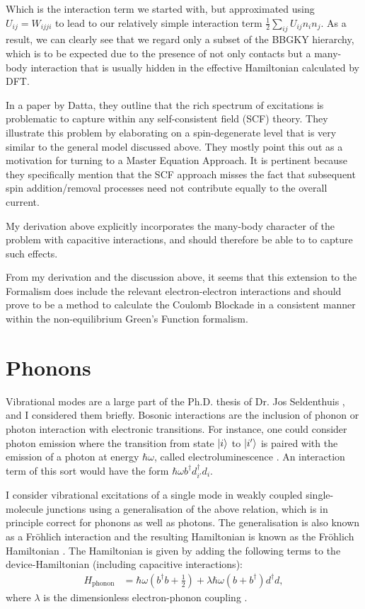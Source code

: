 Which is the interaction term we started with, but approximated using $U_{ij} = W_{ijji}$ to lead to our relatively simple interaction term $\frac{1}{2} \sum_{ij} U_{ij} n_i n_j$. As a result, we can clearly see that we regard only a subset of the BBGKY hierarchy, which is to be expected due to the presence of not only contacts but a many-body interaction that is usually hidden in the effective Hamiltonian calculated by DFT.

In a paper by Datta\cite{mura}, they outline that the rich spectrum of excitations is problematic to capture within any self-consistent field (SCF) theory. They illustrate this problem by elaborating on a spin-degenerate level that is very similar to the general model discussed above. They mostly point this out as a motivation for turning to a Master Equation Approach.  It is pertinent because they specifically mention that the SCF approach misses the fact that subsequent spin addition/removal processes need not contribute equally to the overall current.

My derivation above explicitly incorporates the many-body character of the problem with capacitive interactions, and should therefore be able to to capture such effects.

From my derivation and the discussion above, it seems that this extension to the Formalism does include the relevant electron-electron interactions and should prove to be a method to calculate the Coulomb Blockade in a consistent manner within the non-equilibrium Green's Function formalism.
\section{Phonons}
\label{sec:phononic}

Vibrational modes are a large part of the Ph.D. thesis of Dr. Jos Seldenthuis \cite{seldenthuis}, and I considered them briefly. Bosonic interactions are the inclusion of phonon or photon interaction with electronic transitions. For instance, one could consider photon emission where the transition from state $\ket{i}$ to $\ket{i'}$ is paired with the emission of a photon at energy $\hbar \omega$, called electroluminescence \cite{electroluminescence}. An interaction term of this sort would have the form $\hbar\omega b^\dagger d_{i'}^\dagger d_i$.

I consider vibrational excitations of a single mode in weakly coupled single-molecule junctions using a generalisation of the above relation, which is in principle correct for phonons as well as photons. The generalisation is also known as a Fr\"ohlich interaction and the resulting Hamiltonian is known as the Fr\"ohlich Hamiltonian \cite{frohlich}. The Hamiltonian is given by adding the following terms to the device-Hamiltonian (including capacitive interactions):
\begin{align}
H_\text{phonon} &= \hbar \omega \left(b^\dagger b + \frac{1}{2}\right) + \lambda \hbar \omega (b + b^\dagger) d^\dagger d, \label{eq:phononhamiltonian}
\end{align}
where $\lambda$ is the dimensionless electron-phonon coupling \cite{kaspermothpoulsen}.

